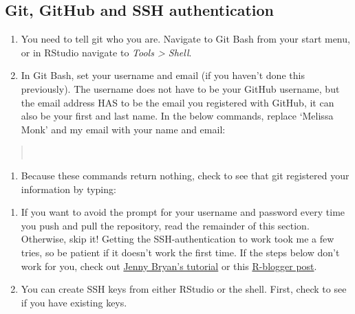 \documentclass[12pt,]{article}
\providecommand{\tightlist}{%
  \setlength{\itemsep}{0pt}\setlength{\parskip}{0pt}}
\begin{document}
\subsection{Git, GitHub and SSH
authentication}\label{git-github-and-ssh-authentication}

\begin{enumerate}
\def\labelenumi{\arabic{enumi}.}
\item
  You need to tell git who you are. Navigate to Git Bash from your start
  menu, or in RStudio navigate to \emph{Tools \textgreater{} Shell}.
\item
  In Git Bash, set your username and email (if you haven't done this
  previously). The username does not have to be your GitHub username,
  but the email address HAS to be the email you registered with GitHub,
  it can also be your first and last name. In the below commands,
  replace `Melissa Monk' and my email with your name and email:
\end{enumerate}

\begin{quote}
\colorbox{light-gray}{}\\
\colorbox{light-gray}{}
\end{quote}

\begin{enumerate}
\def\labelenumi{\arabic{enumi}.}
\setcounter{enumi}{2}
\tightlist
\item
  Because these commands return nothing, check to see that git
  registered your information by typing:
\end{enumerate}

\begin{quote}
\colorbox{light-gray}{}
\end{quote}

\begin{enumerate}
\def\labelenumi{\arabic{enumi}.}
\setcounter{enumi}{3}
\item
  If you want to avoid the prompt for your username and password every
  time you push and pull the repository, read the remainder of this
  section. Otherwise, skip it! Getting the SSH-authentication to work
  took me a few tries, so be patient if it doesn't work the first time.
  If the steps below don't work for you, check out
  \href{http://happygitwithr.com/}{Jenny Bryan's tutorial} or this
  \href{http://www.r-bloggers.com/rstudio-pushing-to-github-with-ssh-authentication/}{R-blogger
  post}.
\item
  You can create SSH keys from either RStudio or the shell. First, check
  to see if you have existing keys.
\end{enumerate}
\end{document}
